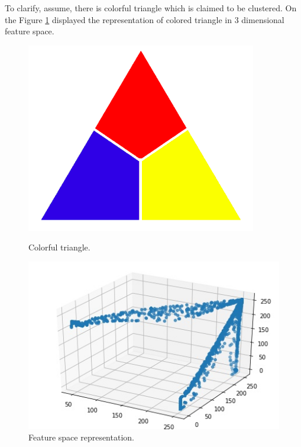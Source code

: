 To clarify, assume, there is colorful triangle which is claimed to be clustered. On the Figure  \ref{fig:clustering} displayed the representation of colored triangle in 3 dimensional feature space.

\begin{figure}[h]
    \centering
    \begin{minipage}[b]{0.4\textwidth}
    \includegraphics[width=\textwidth]{images/k_mean_triangle.png}
    \caption{Colorful triangle.}
    \end{minipage}
    \hfill
    \begin{minipage}[b]{0.4\textwidth}
    \includegraphics[width=\textwidth]{images/k_mean_triangle_clustered.jpg}
    \caption{Feature space representation.}
    \label{fig:clustering}
    \end{minipage}
\end{figure}

